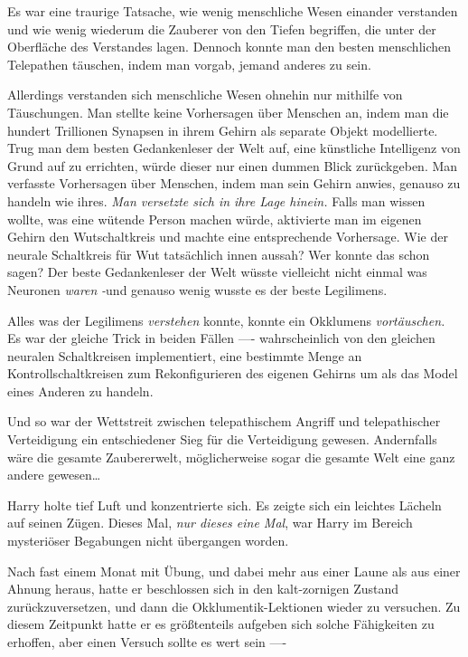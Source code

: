 {Es war eine traurige Tatsache, wie wenig menschliche Wesen einander verstanden und wie wenig wiederum die Zauberer von den Tiefen begriffen, die unter der Oberfläche des Verstandes lagen. Dennoch konnte man den besten menschlichen Telepathen täuschen, indem man vorgab, jemand anderes zu sein.

Allerdings verstanden sich menschliche Wesen ohnehin nur mithilfe von Täuschungen. Man stellte keine Vorhersagen über Menschen an, indem man die hundert Trillionen Synapsen in ihrem Gehirn als separate Objekt modellierte. Trug man dem besten Gedankenleser der Welt auf, eine künstliche Intelligenz von Grund auf zu errichten, würde dieser nur einen dummen Blick zurückgeben. Man verfasste Vorhersagen über Menschen, indem man sein Gehirn anwies, genauso zu handeln wie ihres. \emph{Man versetzte sich in ihre Lage hinein.} Falls man wissen wollte, was eine wütende Person machen würde, aktivierte man im eigenen Gehirn den Wutschaltkreis und machte eine entsprechende Vorhersage. Wie der neurale Schaltkreis für Wut tatsächlich innen aussah? Wer konnte das schon sagen? Der beste Gedankenleser der Welt wüsste vielleicht nicht einmal was Neuronen \emph{waren} \emph{-}und genauso wenig wusste es der beste Legilimens.

Alles was der Legilimens \emph{verstehen} konnte, konnte ein Okklumens \emph{vortäuschen.} Es war der gleiche Trick in beiden Fällen ---- wahrscheinlich von den gleichen neuralen Schaltkreisen implementiert, eine bestimmte Menge an Kontrollschaltkreisen zum Rekonfigurieren des eigenen Gehirns um als das Model eines Anderen zu handeln.

Und so war der Wettstreit zwischen telepathischem Angriff und telepathischer Verteidigung ein entschiedener Sieg für die Verteidigung gewesen. Andernfalls wäre die gesamte Zaubererwelt, möglicherweise sogar die gesamte Welt eine ganz andere gewesen…

Harry holte tief Luft und konzentrierte sich. Es zeigte sich ein leichtes Lächeln auf seinen Zügen. Dieses Mal, \emph{nur dieses eine Mal}, war Harry im Bereich mysteriöser Begabungen nicht übergangen worden.

Nach fast einem Monat mit Übung, und dabei mehr aus einer Laune als aus einer Ahnung heraus, hatte er beschlossen sich in den kalt-zornigen Zustand zurückzuversetzen, und dann die Okklumentik-Lektionen wieder zu versuchen. Zu diesem Zeitpunkt hatte er es größtenteils aufgeben sich solche Fähigkeiten zu erhoffen, aber einen Versuch sollte es wert sein ----

}
